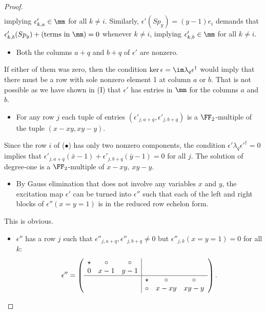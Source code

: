 \begin{proof}
\begin{align}
\end{align}
implying $\epsilon'_{k,a} \in \mm$ for all $k \neq i$.
Similarly, $\epsilon' (S p_y) = (y-1) e_i$ demands that $\epsilon'_{k,b} (S p_y) + (\text{terms in }\mm) = 0$
whenever $k \neq i$, implying $\epsilon'_{k,b} \in \mm$ for all $k \neq i$.
\begin{itemize}
 \item[(II)] Both the columns $a+q$ and $b+q$ of $\epsilon'$ are nonzero.
\end{itemize}
If either of them was zero,
then the condition $\ker \epsilon = \im \lambda_q \epsilon^\dagger$
would imply that there must be a row with sole nonzero element 1 
at column $a$ or $b$.
That is not possible as we have shown in (I) that $\epsilon'$ 
has entries in $\mm$ for the columns $a$ and $b$.
\begin{itemize}
\item[(III)] For any row $j$ 
each tuple of entries $(\epsilon'_{j,a+q},\epsilon'_{j,b+q})$ is a $\FF_2$-multiple of the tuple $(x-xy, xy-y)$.
\end{itemize}
Since the row $i$ of ($\bullet$) has only two nonzero components,
the condition $\epsilon' \lambda_q \epsilon'^\dagger = 0$
implies that $\epsilon'_{j,a+q}(\bar x - 1) 
+ \epsilon'_{j,b+q} ( \bar y -1) = 0$ for all $j$.
The solution of degree-one is a $\FF_2$-multiple of $x-xy, ~xy-y$.
\begin{itemize}
\item[(IV)] By Gauss elimination that does not involve any variables $x$ and $y$,
the excitation map $\epsilon'$ can be turned into $\epsilon''$ such that each of
the left and right blocks of 
$\epsilon''(x=y=1)$
is in the reduced row echelon form.
\end{itemize}
This is obvious.
\begin{itemize}
\item[(V)] $\epsilon''$ has a row $j$ such that $\epsilon''_{j,a+q}, \epsilon''_{j,b+q} \neq 0$ but $\epsilon''_{j,k}(x=y=1) = 0$ for all $k$:
\begin{align}
\epsilon'' = \left(\begin{array}{ccc|ccc}
\star & \circ &  \circ &&&\\
0 & x-1  & y-1 & &&\\
\hline
&&& \star&\circ& \circ\\
&&&  \circ& x-xy & xy-y \\
\end{array}\right).
\end{align}
\end{itemize}

\end{proof}
